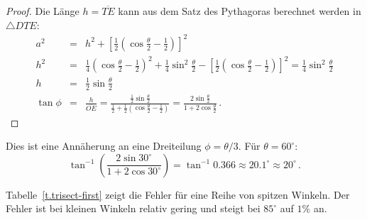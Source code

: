 \begin{proof}
Die Länge $h=\overline{TE}$ kann aus dem Satz des Pythagoras berechnet werden in $\triangle DTE$:
\begin{eqnarray*}
a^2 &=& h^2 + \left[\frac{1}{2}\left(\cos \frac{\theta}{2}-\frac{1}{2}\right)\right]^2\\
h^2&=&\frac{1}{4}\left(\cos \frac{\theta}{2}-\frac{1}{2}\right)^2+\frac{1}{4}\sin^2\frac{\theta}{2}-\left[\frac{1}{2}\left(\cos \frac{\theta}{2}-\frac{1}{2}\right)\right]^2=
\frac{1}{4}\sin^2\frac{\theta}{2}\\
h&=&\frac{1}{2}\sin\frac{\theta}{2}\\
\tan\phi &=&\frac{h}{\overline{OE}}=\displaystyle\frac{\displaystyle\frac{1}{2}\sin\frac{\theta}{2}}{\displaystyle\frac{1}{2}+\frac{1}{2}\left(\cos \frac{\theta}{2}\! -\! \frac{1}{2}\right)}
=\frac{\displaystyle2\sin\frac{\theta}{2}}{\displaystyle 1+2\cos\frac{\theta}{2}}\,.
\end{eqnarray*}                  
\end{proof}

Dies ist eine Annäherung an eine Dreiteilung $\phi=\theta/3$. Für $\theta=60^\circ$:
\[
\tan^{-1}\left(\frac{2\sin 30^\circ}{1+2\cos 30^\circ}\right)=
\tan^{-1}0.366\approx 20.1^\circ\approx 20^\circ\,.
\]

Tabelle~\ref{t.trisect-first} zeigt die Fehler für eine Reihe von spitzen Winkeln. Der Fehler ist bei kleinen Winkeln relativ gering und steigt bei $85^\circ$ auf $1\%$ an.

